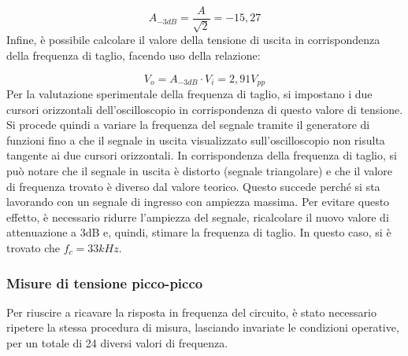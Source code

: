 \[A_{-3dB}=\frac{A}{\sqrt{2}}=-15,27\]
Infine, è possibile calcolare il valore della tensione di uscita in corrispondenza della frequenza di
taglio, facendo uso della relazione:

\[V_o=A_{-3dB} \cdot V_i=2,91V_{pp}\]
Per la valutazione sperimentale della frequenza di taglio, si impostano i due cursori orizzontali dell’oscilloscopio in corrispondenza di questo valore di tensione. Si procede quindi a variare la frequenza del segnale tramite il generatore di funzioni fino a che il segnale in uscita visualizzato sull’oscilloscopio non risulta tangente ai due cursori orizzontali. In corrispondenza della frequenza di taglio, si può notare che il segnale in uscita è distorto (segnale triangolare) e che il valore di frequenza trovato è diverso dal valore teorico. Questo succede perché si sta lavorando con un segnale di ingresso con ampiezza massima. Per evitare questo effetto, è necessario ridurre l’ampiezza del segnale, ricalcolare il nuovo valore di attenuazione a 3dB e, quindi, stimare la frequenza di taglio. In questo caso, si è trovato che \(f_c=33kHz\).
\clearpage
\subsubsection{Misure di tensione picco-picco}

Per riuscire a ricavare la risposta in frequenza del circuito, è stato necessario ripetere la stessa procedura di misura, lasciando invariate le condizioni operative, per un totale di 24 diversi valori di frequenza.

